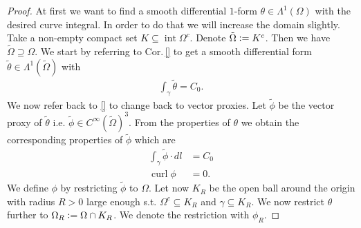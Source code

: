 \documentclass[12pt,a4paper]{article}
\numberwithin{equation}{subsection}
\numberwithin{lemma}{subsection}
\theoremstyle{definition}
\DeclareMathOperator{\curl}{curl}
\DeclareMathOperator{\interior}{int}
\begin{document}
\begin{proof}
    At first we want to find a smooth differential $1$-form 
    $\theta \in \Lambda^1(\Omega)$ with the desired curve integral. 
    In order to do that we will increase the 
    domain slightly.
    Take a non-empty compact set $K \subseteq \interior \Omega^c$. 
    Denote $\tilde{\Omega} \vcentcolon= K^c$. Then we have 
    $\tilde{\Omega} \supseteq \Omega$. 
    We start by referring to Cor.\,\ref{} to get a smooth differential form 
    $\tilde{\theta} \in \Lambda^1(\tilde{\Omega})$ with 
    \begin{align*}
        \int_\gamma \tilde{\theta} = C_0.
    \end{align*}
    We now refer back to \ref{} to change back to vector proxies. Let 
    $\tilde{\phi}$ be the vector proxy of $\tilde{\theta}$ 
    i.e. $\tilde{\phi} \in C^\infty(\tilde{\Omega})^3$.
    From the properties of $\theta$ we obtain the corresponding properties 
    of $\tilde{\phi}$ which are 
    \begin{align*}
        \int_\gamma \tilde{\phi} \cdot dl &= C_0 
        \\ \curl \phi &= 0.
    \end{align*}
    We define $\phi$ by restricting $\tilde{\phi}$ to $\Omega$. 
    Let now $K_R$ be the open ball around the origin with radius $R>0$ large
    enough s.t. $\Omega^c \subseteq K_R$ and $\gamma \subseteq K_R$. 
    We now restrict $\theta$ further to
    $\Omega_R \vcentcolon= \Omega \cap K_R$. We denote the restriction with 
    $\phi_R$. 


\end{proof}
\end{document}
